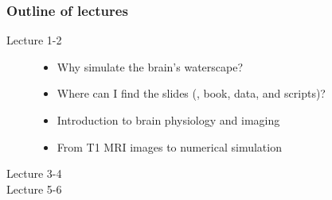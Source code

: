 \documentclass[mathserif, aspectratio=169]{beamer}
\begin{document}
{
\begin{frame}
\end{frame}
}

\begin{frame}
  \frametitle{Outline of lectures}
  \begin{description}
    \item[Lecture 1-2]
      \begin{itemize}
      \item
        Why simulate the brain's waterscape?
      \item
        Where can I find the slides (, book, data, and scripts)?
      \item
        Introduction to brain physiology and imaging
      \item
        From T1 MRI images to numerical simulation
      \end{itemize}
    \item[Lecture 3-4]
    \item[Lecture 5-6]
  \end{description}

\end{frame}
\end{document}
